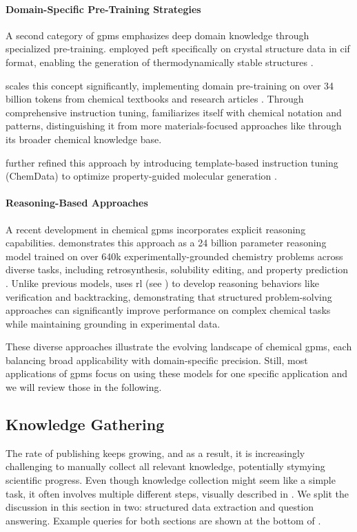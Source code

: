 \paragraph{Domain-Specific Pre-Training Strategies} A second category of \glspl{gpm} emphasizes deep domain knowledge through specialized pre-training.  employed \gls{peft} specifically on crystal structure data in \gls{cif} format, enabling the generation of thermodynamically stable structures \autocite{mishra2024foundational}.

 scales this concept significantly, implementing domain pre-training on over 34 billion tokens from chemical textbooks and research articles \autocite{zhao2024chemdfm}. Through comprehensive instruction tuning,  familiarizes itself with chemical notation and patterns, distinguishing it from more materials-focused approaches like  through its broader chemical knowledge base.

 further refined this approach by introducing template-based instruction tuning (ChemData) to optimize property-guided molecular generation \autocite{zhang2024chemllm}.

\paragraph{Reasoning-Based Approaches} A recent development in chemical \glspl{gpm} incorporates explicit reasoning capabilities.  demonstrates this approach as a 24 billion parameter reasoning model trained on over 640k experimentally-grounded chemistry problems across diverse tasks, including retrosynthesis, solubility editing, and property prediction \autocite{narayanan2025training}. 
Unlike previous models,  uses \gls{rl} (see ) to develop reasoning behaviors like verification and backtracking, demonstrating that structured problem-solving approaches can significantly improve performance on complex chemical tasks while maintaining grounding in experimental data.

These diverse approaches illustrate the evolving landscape of chemical \glspl{gpm}, each balancing broad applicability with domain-specific precision.
Still, most applications of \glspl{gpm} focus on using these models for one specific application and we will review those in the following.

\subsection{Knowledge Gathering}\label{sec:information_gathering}
The rate of publishing keeps growing, and as a result, it is increasingly challenging to manually collect all relevant knowledge, potentially stymying scientific progress.\autocite{schilling2025text, Chu_2021}
Even though knowledge collection might seem like a simple task, it often involves multiple different steps, visually described in . We split the discussion in this section in two: structured data extraction and question answering.  Example queries for both sections are shown at the bottom of .

